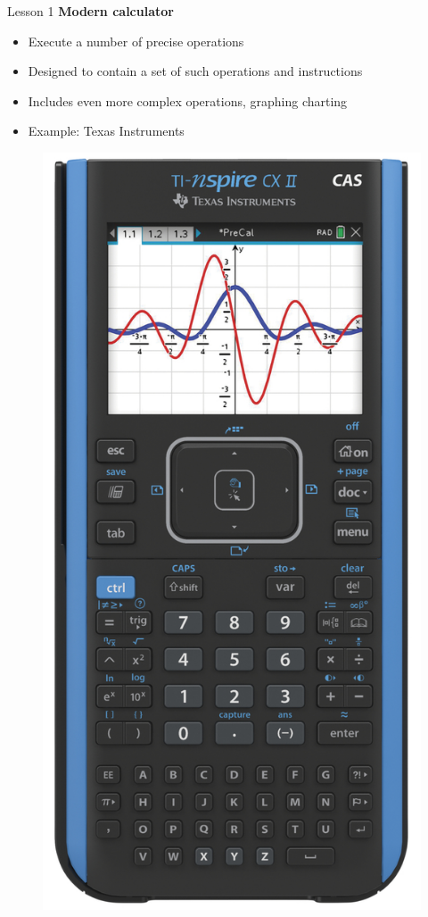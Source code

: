 \documentclass[aspectratio=1610]{beamer}
\begin{document}
\begin{frame}{Lesson 1}{}
{\Large\textbf{{Modern calculator}}}
\Large
\begin{minipage}{0.70\textwidth}
    \begin{itemize}
      \item Execute a number of precise operations
      \item Designed to contain a set of such operations and instructions
      \item Includes even more complex operations, graphing charting
      \item Example: Texas Instruments
    \end{itemize}
  \end{minipage}
\begin{minipage}{.0\textwidth}
      \begin{figure}
        \includegraphics[scale=0.60]{Images/TI}

\end{figure}
\end{minipage}
\end{frame}
\end{document}

